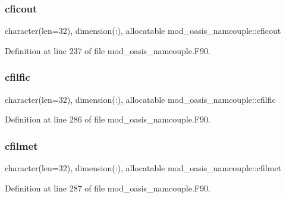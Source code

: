 \subsubsection{\texorpdfstring{cficout}{cficout}}
{\footnotesize\ttfamily character(len=32), dimension(\+:), allocatable mod\+\_\+oasis\+\_\+namcouple\+::cficout\hspace{0.3cm}{\ttfamily [private]}}



Definition at line 237 of file mod\+\_\+oasis\+\_\+namcouple.\+F90.

\mbox{\label{namespacemod__oasis__namcouple_a10f5e54ac2bf61f604faa422a748724f}} 
\subsubsection{\texorpdfstring{cfilfic}{cfilfic}}
{\footnotesize\ttfamily character(len=32), dimension(\+:), allocatable mod\+\_\+oasis\+\_\+namcouple\+::cfilfic\hspace{0.3cm}{\ttfamily [private]}}



Definition at line 286 of file mod\+\_\+oasis\+\_\+namcouple.\+F90.

\mbox{\label{namespacemod__oasis__namcouple_ab97dbc120a10a399af30114b8112271d}} 
\subsubsection{\texorpdfstring{cfilmet}{cfilmet}}
{\footnotesize\ttfamily character(len=32), dimension(\+:), allocatable mod\+\_\+oasis\+\_\+namcouple\+::cfilmet\hspace{0.3cm}{\ttfamily [private]}}



Definition at line 287 of file mod\+\_\+oasis\+\_\+namcouple.\+F90.

\mbox{\label{namespacemod__oasis__namcouple_ade62d9a196cb7afbfd082442bfb80707}} 
